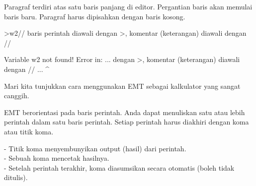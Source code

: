 \documentclass[a4paper,10pt]{article}
\begin{document}
\begin{eulernotebook}
\begin{eulercomment}
\begin{eulercomment}
\begin{eulercomment}
\begin{eulercomment}
\begin{eulercomment}
Paragraf terdiri atas satu baris panjang di editor. Pergantian baris
akan memulai baris baru. Paragraf harus dipisahkan dengan baris
kosong.
\end{eulercomment}
\begin{eulerprompt}
>w2// baris perintah diawali dengan >, komentar (keterangan) diawali dengan //
\end{eulerprompt}
\begin{euleroutput}
  Variable w2 not found!
  Error in:
  ... dengan >, komentar (keterangan) diawali dengan // ...
                                                       ^
\end{euleroutput}
\begin{eulercomment}
Mari kita tunjukkan cara menggunakan EMT sebagai kalkulator yang sangat
canggih.

EMT berorientasi pada baris perintah. Anda dapat menuliskan satu atau lebih
perintah dalam satu baris perintah. Setiap perintah harus diakhiri dengan koma
atau titik koma.

- Titik koma menyembunyikan output (hasil) dari perintah.\\
- Sebuah koma mencetak hasilnya.\\
- Setelah perintah terakhir, koma diasumsikan secara otomatis (boleh tidak
ditulis).


\end{eulercomment}
\end{eulercomment}
\end{eulercomment}
\end{eulercomment}
\end{eulercomment}
\end{eulernotebook}
\end{document}
